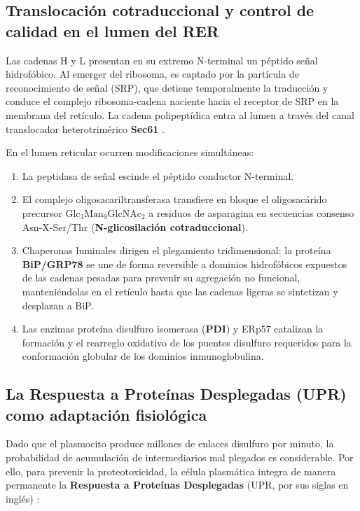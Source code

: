 \subsection{Translocación cotraduccional y control de calidad en el lumen del RER}
Las cadenas $\text{H}$ y $\text{L}$ presentan en su extremo N-terminal un péptido señal hidrofóbico. Al emerger del ribosoma, es captado por la partícula de reconocimiento de señal (SRP), que detiene temporalmente la traducción y conduce el complejo ribosoma-cadena naciente hacia el receptor de SRP en la membrana del retículo. La cadena polipeptídica entra al lumen a través del canal translocador heterotrimérico \textbf{Sec61} \parencite{alberts2022molecular,karp2020cell}.

En el lumen reticular ocurren modificaciones simultáneas:
\begin{enumerate}
	\item La peptidasa de señal escinde el péptido conductor N-terminal.
	\item El complejo oligosacariltransferasa transfiere en bloque el oligosacárido precursor $\text{Glc}_3\text{Man}_9\text{GlcNAc}_2$ a residuos de asparagina en secuencias consenso Asn-X-Ser/Thr (\textbf{N-glicosilación cotraduccional}).
	\item Chaperonas luminales dirigen el plegamiento tridimensional: la proteína \textbf{BiP/GRP78} se une de forma reversible a dominios hidrofóbicos expuestos de las cadenas pesadas para prevenir su agregación no funcional, manteniéndolas en el retículo hasta que las cadenas ligeras se sintetizan y desplazan a BiP.
	\item Las enzimas proteína disulfuro isomerasa (\textbf{PDI}) y ERp57 catalizan la formación y el rearreglo oxidativo de los puentes disulfuro requeridos para la conformación globular de los dominios inmunoglobulina.
\end{enumerate}

\subsection{La Respuesta a Proteínas Desplegadas (UPR) como adaptación fisiológica}
Dado que el plasmocito produce millones de enlaces disulfuro por minuto, la probabilidad de acumulación de intermediarios mal plegados es considerable. Por ello, para prevenir la proteotoxicidad, la célula plasmática integra de manera permanente la \textbf{Respuesta a Proteínas Desplegadas} (UPR, por sus siglas en inglés) \parencite{walter2011unfolded,cenci2008progressive}:

